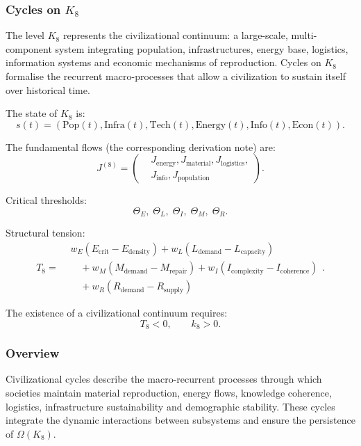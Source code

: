 
\subsubsection{Cycles on \texorpdfstring{$K_8$}{K_8}}
\label{sec:cycles-k8}

The level $K_8$ represents the civilizational continuum: a large-scale,
multi-component system integrating population, infrastructures, energy base,
logistics, information systems and economic mechanisms of reproduction.
Cycles on $K_8$ formalise the recurrent macro-processes that allow a
civilization to sustain itself over historical time.

The state of $K_8$ is:
\[
  s(t) = (\text{Pop}(t), \text{Infra}(t), \text{Tech}(t),
           \text{Energy}(t), \text{Info}(t), \text{Econ}(t)).
\]

The fundamental flows (the corresponding derivation note) are:
\[
  J^{(8)} =
  \left(
  \begin{aligned}
   &J_{\mathrm{energy}}, J_{\mathrm{material}}, J_{\mathrm{logistics}},\\
   &J_{\mathrm{info}}, J_{\mathrm{population}}
  \end{aligned}
  \right).
\]

Critical thresholds:
\[
  \Theta_E,\;
  \Theta_L,\;
  \Theta_I,\;
  \Theta_M,\;
  \Theta_R.
\]

Structural tension:
\[
  T_8 =
  \begin{aligned}
    &w_E(E_{\mathrm{crit}} - E_{\mathrm{density}})
    + w_L(L_{\mathrm{demand}} - L_{\mathrm{capacity}})\\
    &\quad + w_M(M_{\mathrm{demand}} - M_{\mathrm{repair}})
    + w_I(I_{\mathrm{complexity}} - I_{\mathrm{coherence}})\\
    &\quad + w_R(R_{\mathrm{demand}} - R_{\mathrm{supply}})
  \end{aligned}
  .
\]

The existence of a civilizational continuum requires:
\[
  T_8 < 0,\qquad k_8>0.
\]

\subsubsection{Overview}

Civilizational cycles describe the macro-recurrent processes through which
societies maintain material reproduction, energy flows, knowledge coherence,
logistics, infrastructure sustainability and demographic stability.
These cycles integrate the dynamic interactions between subsystems and ensure
the persistence of $\Omega(K_8)$.

